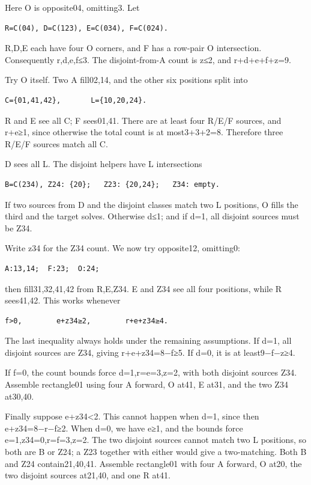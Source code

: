 \documentclass[
  10pt,
]{article}
\begin{document}
Here O is opposite04, omitting3. Let

\begin{verbatim}
R=C(04), D=C(123), E=C(034), F=C(024).
\end{verbatim}

R,D,E each have four O corners, and F has a row-pair O intersection.
Consequently r,d,e,f≤3. The disjoint-from-A count is z≤2, and
r+d+e+f+z=9.

Try O itself. Two A fill02,14, and the other six positions split into

\begin{verbatim}
C={01,41,42},       L={10,20,24}.
\end{verbatim}

R and E see all C; F sees01,41. There are at least four R/E/F sources,
and r+e≥1, since otherwise the total count is at most3+3+2=8. Therefore
three R/E/F sources match all C.

D sees all L. The disjoint helpers have L intersections

\begin{verbatim}
B=C(234), Z24: {20};   Z23: {20,24};   Z34: empty.
\end{verbatim}

If two sources from D and the disjoint classes match two L positions, O
fills the third and the target solves. Otherwise d≤1; and if d=1, all
disjoint sources must be Z34.

Write z34 for the Z34 count. We now try opposite12, omitting0:

\begin{verbatim}
A:13,14;  F:23;  O:24;
\end{verbatim}

then fill31,32,41,42 from R,E,Z34. E and Z34 see all four positions,
while R sees41,42. This works whenever

\begin{verbatim}
f>0,        e+z34≥2,        r+e+z34≥4.
\end{verbatim}

The last inequality always holds under the remaining assumptions. If
d=1, all disjoint sources are Z34, giving r+e+z34=8−f≥5. If d=0, it is
at least9−f−z≥4.

If f=0, the count bounds force d=1,r=e=3,z=2, with both disjoint sources
Z34. Assemble rectangle01 using four A forward, O at41, E
at31, and the two Z34 at30,40.

Finally suppose e+z34\textless2. This cannot happen when d=1, since then
e+z34=8−r−f≥2. When d=0, we have e≥1, and the bounds force
e=1,z34=0,r=f=3,z=2. The two disjoint sources cannot match two L
positions, so both are B or Z24; a Z23 together with either would give a
two-matching. Both B and Z24 contain21,40,41. Assemble
rectangle01 with four A forward, O at20, the two disjoint
sources at21,40, and one R at41.
\end{document}
